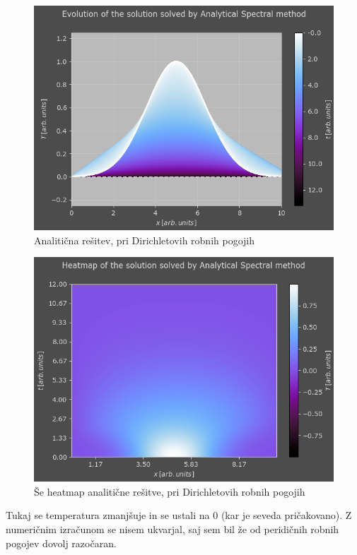 \documentclass[a4paper]{article}
\begin{document}
\begin{figure}[H]
    \centering
        \includegraphics[width=\linewidth]{./images/S_Analytic_D.png}
        \caption{Analitična rešitev, pri Dirichletovih robnih pogojih}
    \label{fig:5}
\end{figure}

\begin{figure}[H]
    \centering
        \includegraphics[width=\linewidth]{./images/S_Analytic_D_Heatmap.png}
        \caption{Še heatmap analitične rešitve, pri Dirichletovih robnih pogojih}
    \label{fig:6}
\end{figure}

Tukaj se temperatura zmanjšuje in se ustali na $0$ (kar je seveda pričakovano). Z numeričnim izračunom se nisem ukvarjal,
saj sem bil že od peridičnih robnih pogojev dovolj razočaran.\\
\end{document}
